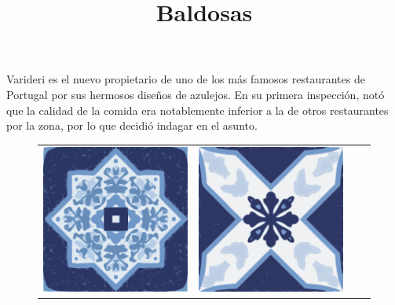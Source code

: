 \documentclass{oci}
\title{Baldosas}
\begin{document}
\begin{problemDescription}
Varideri es el nuevo propietario de uno de los más famosos restaurantes de Portugal por sus hermosos diseños de azulejos.
En su primera inspección, notó que la calidad de la comida era notablemente inferior a la de otros restaurantes por la zona, por lo que decidió indagar en el asunto.

\setlength{\tabcolsep}{0.5pt}
\begin{figure}[h]
  \begin{center}
    {
      \renewcommand{\arraystretch}{0.25}
      \begin{tabular}{cccc}
        \includegraphics[scale=0.3]{a.eps} &
        \includegraphics[scale=0.3]{b.eps} &

\end{tabular}}
\end{center}
\end{figure}
\end{problemDescription}
\end{document}
